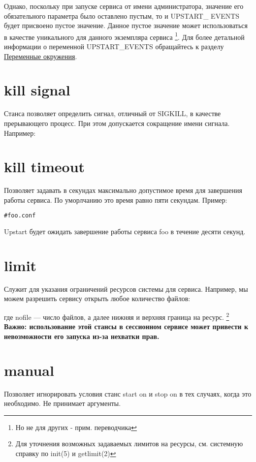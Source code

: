 Однако, поскольку при запуске сервиса от имени администратора, значение его обязательного параметра было оставлено пустым, то и UPSTART\_ EVENTS будет присвоено пустое значение. Данное пустое значение может использоваться в качестве уникального для данного экземпляра сервиса \footnote{Но не для других - прим. переводчика}. Для более детальной информации о переменной UPSTART\_EVENTS обращайтесь к разделу \hyperref[sec:EnviromentVariables]{Переменные окружения}.
\section{kill signal} \label{sec:KillSignal}
Станса позволяет определить сигнал, отличный от SIGKILL, в качестве прерывающего процесс. 
При этом допускается сокращение имени сигнала. Например: \begin{alltt}
\end{alltt}
\section{kill timeout}
Позволяет задавать в секундах максимально допустимое время для завершения работы сервиса. По уморлчанию это время равно пяти секундам. Пример: \begin{alltt}
#foo.conf
\end{alltt} Upstart будет ожидать завершение работы сервиса foo в течение десяти секунд.
\section{limit}
Служит для указания ограничений ресурсов системы для сервиса. Например, мы можем разрешить сервису открыть любое количество файлов: \begin{alltt}
\end{alltt} где nofile --- число файлов, а далее нижняя и верхняя граница на ресурс.  \footnote{Для уточнения возможных задаваемых лимитов на ресурсы, см. системную справку по init(5) и getlimit(2)} \\
\textbf{Важно: использование этой стансы в сессионном сервисе может привести к невозможности его запуска из-за нехватки прав.}
\section{manual}
Позволяет игнорировать условия станс start on и stop on в тех случаях, когда это необходимо. Не принимает аргументы.
